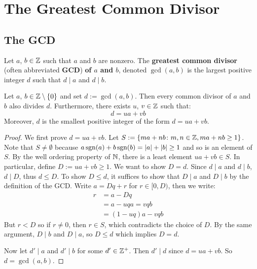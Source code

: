 \section{The Greatest Common Divisor}

\subsection{The GCD}

\begin{defbox}
   Let $a$, $b \in \mathbb{Z}$ such that $a$ and $b$ are nonzero. The \textbf{greatest common divisor} (often abbreviated \textbf{GCD}) \textbf{of $a$ and $b$}, denoted $\gcd(a,b)$ is the largest positive integer $d$ such that $d \mid a$ and $d \mid b$. 
\end{defbox}

\begin{thmbox}
   Let $a$, $b \in \mathbb{Z}\setminus \{0\}$ and set $d := \gcd(a,b)$. Then every common divisor of $a$ and $b$ also divides $d$. Furthermore, there exists $u$, $v \in \mathbb{Z}$ such that:
   \[ d = ua + vb \]
   Moreover, $d$ is the smallest positive integer of the form $d = ua + vb$. 
\end{thmbox}

\begin{proof}
   We first prove $d = ua + vb$. Let $S := \{ma + nb \colon m, n \in \mathbb{Z}, ma + nb \geq 1 \}$. Note that $S \neq \emptyset$ because $a\operatorname{sgn}(a) + b\operatorname{sgn}(b) = |a| + |b| \geq 1$ and so is an element of $S$. By the well ordering property of $\mathbb{N}$, there is a least element $ua + vb \in S$. In particular, define $D := ua + vb \geq 1$. We want to show $D = d$. Since $d \mid a$ and $d \mid b$, $d \mid D$, thus $d \leq D$. To show $D \leq d$, it suffices to show that $D \mid a$ and $D \mid b$ by the definition of the GCD. Write $a = Dq + r$ for $r \in [0, D)$, then we write:
   \begin{align*}
      r &= a - Dq \\
        &= a - uqa = vqb \\
        &= (1 - uq)a - vqb 
   \end{align*}
   But $r < D$ so if $r \neq 0$, then $r \in S$, which contradicts the choice of $D$. By the same argument, $D \mid b$ and $D \mid a$, so $D \leq d$ which implies $D = d$. 

   Now let $d' \mid a$ and $d' \mid b$ for some $d' \in \mathbb{Z}^+$. Then $d' \mid d$ since $d = ua + vb$. So $d = \gcd(a,b)$.
\end{proof}


